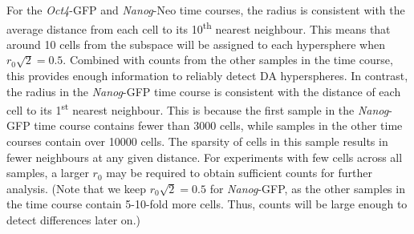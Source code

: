 \documentclass{article}
\begin{document}
%
  
For the \textit{Oct4}-GFP and \textit{Nanog}-Neo time courses, the radius is consistent with the average distance from each cell to its 10\textsuperscript{th} nearest neighbour.
This means that around 10 cells from the subspace will be assigned to each hypersphere when $r_0\sqrt{2}=0.5$.
Combined with counts from the other samples in the time course, this provides enough information to reliably detect DA hyperspheres.
In contrast, the radius in the \textit{Nanog}-GFP time course is consistent with the distance of each cell to its 1\textsuperscript{st} nearest neighbour.
This is because the first sample in the \textit{Nanog}-GFP time course contains fewer than 3000 cells, while samples in the other time courses contain over 10000 cells.
The sparsity of cells in this sample results in fewer neighbours at any given distance.
For experiments with few cells across all samples, a larger $r_0$ may be required to obtain sufficient counts for further analysis.
(Note that we keep $r_0\sqrt{2}=0.5$ for \textit{Nanog}-GFP, as the other samples in the time course contain 5-10-fold more cells.
Thus, counts will be large enough to detect differences later on.)
\end{document}
